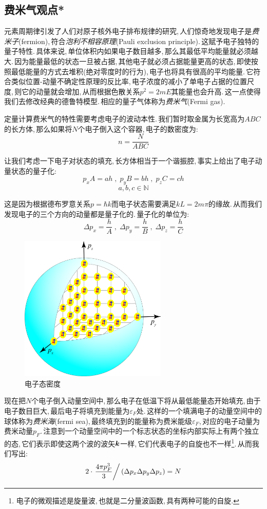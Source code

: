 \subsection{费米气观点*}

元素周期律引发了人们对原子核外电子排布规律的研究,\,人们惊奇地发现电子是\emph{费米子}(fermion),\,符合\emph{泡利不相容原理}(Pauli exclusion principle).\,这赋予电子独特的量子特性.\,具体来说,\,单位体积内如果电子数目越多,\,那么其最低平均能量就必须越大.\,因为能量最低的状态一旦被占据,\,其他电子就必须占据能量更高的状态,\,即使按照最低能量的方式去堆积(绝对零度时的行为),\,电子也将具有很高的平均能量.\,它符合类似位置-动量不确定性原理的反比率,\,电子浓度的减小了单电子占据的位置尺度,\,则它的动量就会增加,\,从而根据色散关系$p^2=2mE$其能量也会升高.\,这一点使得我们去修改经典的德鲁特模型.\,相应的量子气体称为\emph{费米气}(Fermi gas).

定量计算费米气的特性需要考虑电子的波动本性.\,我们暂时取金属为长宽高为$ABC$的长方体,\,那么如果将$N$个电子倒入这个容器,\,电子的数密度为:
\[n=\frac{N}{ABC}\]

让我们考虑一下电子对状态的填充,\,长方体相当于一个谐振腔,\,事实上给出了电子动量状态的量子化:
\[p_x A=ah\;,\; p_y B=bh\;,\; p_z C=ch\]
\[a,b,c\in\mathbb{N}\]

这是因为根据德布罗意关系$p=\hbar k$而电子状态需要满足$kL=2m\pi$的缘故.\,从而我们发现电子的三个方向的动量都是量子化的.\,量子化的单位为:
\[\Delta p_x=\frac{h}{A}\;,\;\Delta p_y=\frac{h}{B}\;,\;\Delta p_z=\frac{h}{C}\]

\begin{figure}
\centering
\includegraphics[width=7cm]{image/7-3-1.png}
\caption{电子态密度}
\end{figure}
现在把$N$个电子倒入动量空间中,\,那么电子在低温下将从最低能量态开始填充,\,由于电子数目巨大,\,最后电子将填充到能量为$\varepsilon_F$处.\,这样的一个填满电子的动量空间中的球体称为\emph{费米海}(fermi sea),\,最终填充到的能量称为费米能级$\varepsilon_F$,\,对应的电子动量为费米动量$p_F$.\,注意到一个动量空间中的一个标志状态的坐标内部实际上有两个独立的态,\,它们表示即使这两个波的波矢$\boldsymbol{k}$一样,\,它们代表电子的自旋也不一样\footnote{电子的微观描述是旋量波,\,也就是二分量波函数,\,具有两种可能的自旋.}.\,从而我们写出:
\[2\cdot\left.\frac{4\pi p_F^3}{3}\right/(\Delta p_x \Delta p_y \Delta p_z)=N\]

